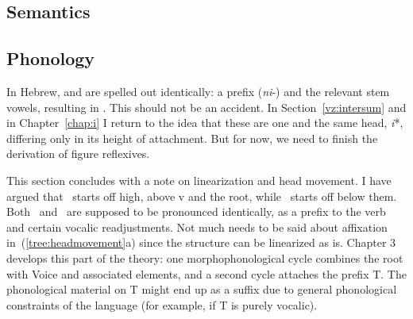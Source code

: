 	\subsection{Semantics} \label{vz:pz:sem}
	
	\subsection{Phonology} \label{vz:pz:phono}
In Hebrew, {\vz} and {\pz} are spelled out identically: a prefix (\emph{ni}-) and the relevant stem vowels, resulting in {\tnif}. This should not be an accident. In Section~\ref{vz:intersum} and in Chapter~\ref{chap:i} I return to the idea that these are one and the same head, \emph{i}*, differing only in its height of attachment. But for now, we need to finish the derivation of figure reflexives.



This section concludes with a note on linearization and head movement. I have argued that \vz~starts off high, above v and the root, while \pz~starts off below them. Both \vz~and \pz~are supposed to be pronounced identically, as a prefix to the verb and certain vocalic readjustments.
\ex\label{tree:headmovement}
\xe
Not much needs to be said about affixation in~(\ref{tree:headmovement}a) since the structure can be linearized as is. Chapter 3 develops this part of the theory: one morphophonological cycle combines the root with Voice and associated elements, and a second cycle attaches the prefix T. The phonological material on T might end up as a suffix due to general phonological constraints of the language (for example, if T is purely vocalic).

